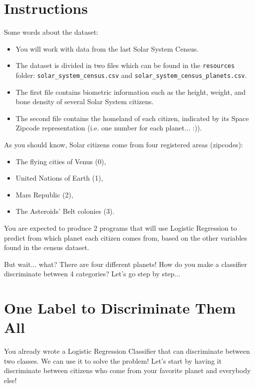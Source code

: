 \documentclass{42-en}
\begin{document}
\section*{Instructions}
Some words about the dataset:
\begin{itemize}
  \item You will work with data from the last Solar System Census.
  \item The dataset is divided in two files which can be found in the \texttt{resources} folder: \texttt{solar\_system\_census.csv} and \texttt{solar\_system\_census\_planets.csv}.
  \item The first file contains biometric information such as the height, weight, and bone density of several Solar System citizens.
  \item The second file contains the homeland of each citizen, indicated by its Space Zipcode representation (i.e. one number for each planet... :)).
\end{itemize}

\newpage

As you should know, Solar citizens come from four registered areas (zipcodes): 
\begin{itemize}
  \item The flying cities of Venus (0), 
  \item United Nations of Earth (1), 
  \item Mars Republic (2), 
  \item The Asteroids' Belt colonies (3).
\end{itemize}


You are expected to produce 2 programs that will use Logistic Regression to predict from which planet each citizen comes from, based on the other variables found in the census dataset.  

But wait... what? There are four different planets! How do you make a classifier discriminate between 4 categories? Let's go step by step...


\section*{One Label to Discriminate Them All}
You already wrote a Logistic Regression Classifier that can discriminate between two classes.
We can use it to solve the problem!
Let's start by having it discriminate between citizens who come from your favorite planet and everybody else!
\end{document}
